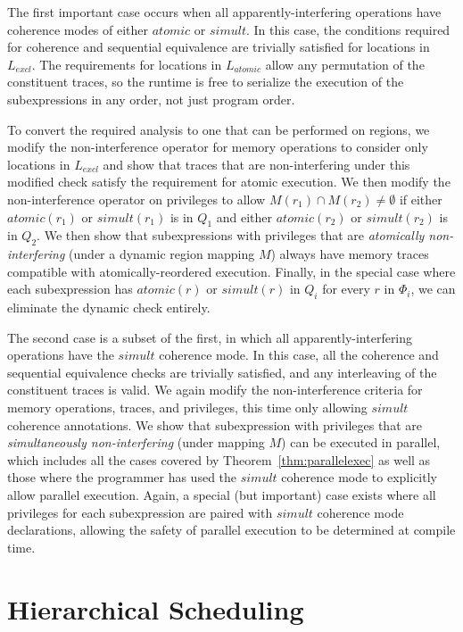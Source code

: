 The first important case occurs when all apparently-interfering operations have coherence modes
of either $atomic$ or $simult$.  In this case, the conditions required for
coherence and sequential equivalence are trivially satisfied for locations in $L_{excl}$.  The
requirements for locations in $L_{atomic}$ allow any permutation of the constituent traces,
so the runtime is free to serialize the execution of the subexpressions in any order, not just
program order.

To convert the required analysis to one that can be performed on regions, we modify
the non-interference operator for memory operations to consider only locations in $L_{excl}$ and show that
traces that are non-interfering under this modified check satisfy the requirement for atomic
execution.  We then modify the non-interference operator on privileges to allow 
$M(r_1) \cap M(r_2) \not= \emptyset$ if either $atomic(r_1)$ or $simult(r_1)$ is in $Q_1$ and
either $atomic(r_2)$ or $simult(r_2)$ is in $Q_2$. We then show that subexpressions with 
privileges that are {\em atomically non-interfering} (under a dynamic region mapping
$M$) always have memory traces compatible with atomically-reordered execution.  Finally,
in the special case where each subexpression has $atomic(r)$ or $simult(r)$ in $Q_i$ for every $r$
in $\Phi_i$, we can eliminate the dynamic check entirely.

The second case is a subset of the first, in which all apparently-interfering operations have
the $simult$ coherence mode.  In this case, all the coherence and sequential equivalence 
checks are trivially satisfied, and any interleaving of the constituent traces is valid.
We again modify the non-interference criteria for memory operations, traces, and privileges, this time
only allowing $simult$ coherence annotations. We show that subexpression with privileges
that are {\em simultaneously non-interfering} (under mapping $M$) can be executed
in parallel, which includes all the cases covered by Theorem~\ref{thm:parallelexec} as well
as those where the programmer has used the $simult$ coherence mode to explicitly allow parallel
execution.  Again, a special (but important) case exists where all privileges for each
subexpression are paired with $simult$ coherence mode declarations, allowing the safety of
parallel execution to be determined at compile time.

\section{Hierarchical Scheduling}
\label{sec:scheduling}

